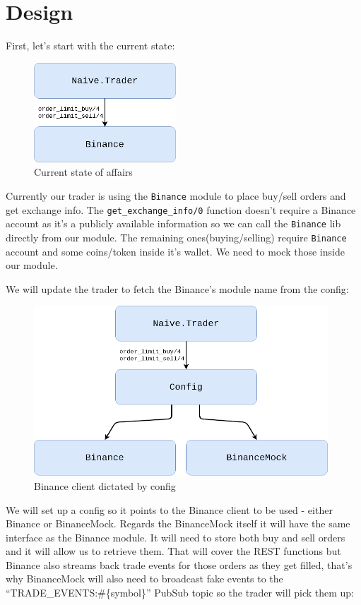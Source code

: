 \documentclass[
]{book}
\begin{document}
\hypertarget{design-1}{%
\section{Design}\label{design-1}}

First, let's start with the current state:

\begin{figure}
\centering
\includegraphics{images/chapter_04_01_current_state.png}
\caption{Current state of affairs}
\end{figure}

Currently our trader is using the \texttt{Binance} module to place buy/sell
orders and get exchange info.
The \texttt{get\_exchange\_info/0} function doesn't require a Binance account as it's a publicly available information so we can call the \texttt{Binance} lib directly from our module.
The remaining ones(buying/selling) require \texttt{Binance} account and some coins/token inside it's wallet. We need to mock those inside our module.

We will update the trader to fetch the Binance's module name from the config:

\begin{figure}
\centering
\includegraphics{images/chapter_04_02_proposal.png}
\caption{Binance client dictated by config}
\end{figure}

We will set up a config so it points to the Binance client to be used - either Binance or BinanceMock. Regards the BinanceMock itself it will have the same interface as the Binance module.
It will need to store both buy and sell orders and it will allow us to retrieve them. That will cover the REST functions but Binance also streams back trade events for those orders as they get filled, that's why BinanceMock will also need to broadcast fake events to the ``TRADE\_EVENTS:\#\{symbol\}'' PubSub topic so the trader will pick them up:
\end{document}
